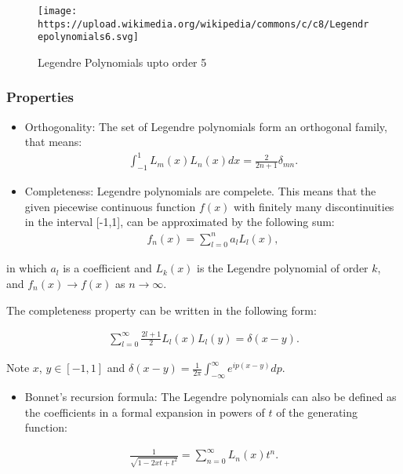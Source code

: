 \documentclass[
  a4paper,
  10pt]{article}
\providecommand{\tightlist}{%
  \setlength{\itemsep}{0pt}\setlength{\parskip}{0pt}}
\begin{document}
\begin{figure}
\centering
\texttt{[image: https://upload.wikimedia.org/wikipedia/commons/c/c8/Legendrepolynomials6.svg]}
\caption{Legendre Polynomials upto order 5}
\end{figure}

\hypertarget{properties}{%
\subsubsection{Properties}\label{properties}}

\begin{itemize}
\item
  Orthogonality: The set of Legendre polynomials form an orthogonal
  family, that means: \begin{align}
  \int_{-1}^1 L_m(x)L_n(x) dx = \frac{2}{2n+1}\delta_{mn}.
  \end{align}
\item
  Completeness: Legendre polynomials are compelete. This means that the
  given piecewise continuous function \(f(x)\) with finitely many
  discontinuities in the interval {[}-1,1{]}, can be approximated by the
  following sum: \begin{align}
  f_n(x)=\sum_{l=0}^{n}a_lL_l(x),
  \end{align}
\end{itemize}

in which \(a_l\) is a coefficient and \(L_k(x)\) is the Legendre
polynomial of order \(k\), and \(f_n(x) \to f(x)\) as \(n \to \infty\).

The completeness property can be written in the following form:

\begin{align}
\sum_{l=0}^{\infty}\frac{2l+1}{2}L_l(x)L_l(y) = \delta(x-y).
\end{align}

Note \(x\), \(y\in [-1,1]\) and
\(\delta(x-y) = \frac{1}{2\pi}\int_{-\infty}^{\infty}e^{ip(x-y)}dp\).

\begin{itemize}
\tightlist
\item
  Bonnet's recursion formula: The Legendre polynomials can also be
  defined as the coefficients in a formal expansion in powers of \(t\)
  of the generating function:
\end{itemize}

\begin{align}
\frac{1}{\sqrt{1-2xt+t^2}} = \sum_{n=0}^{\infty}L_n(x)t^n.
\end{align}
\end{document}
